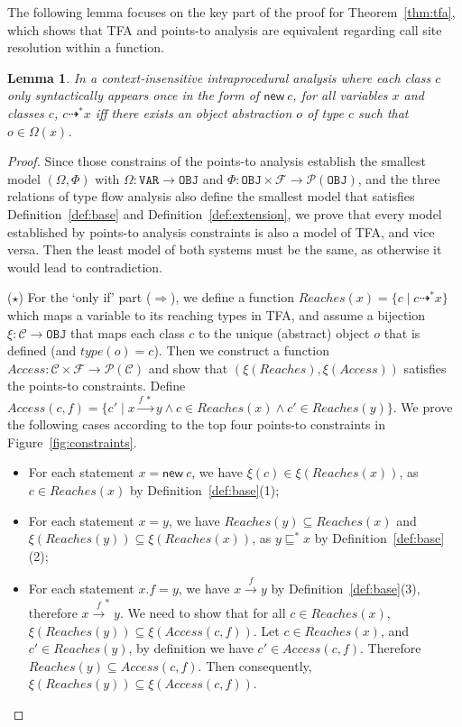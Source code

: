 \documentclass{fac}
\newtheorem{Lemma}{Lemma}
\newcommand{\keyword}[1]{\mathsf{#1}}
\newcommand{\kwnew}[0]{\keyword{new}}
\newcommand\Var{\mathtt{VAR}}
\newcommand\Obj{\mathtt{OBJ}}
\newcommand{\VPT}{\Omega}
\newcommand{\HPT}{\Phi}
\newcommand{\Class}{\mathcal{C}}
\newcommand{\Field}{\mathcal{F}}
\newcommand{\less}{\sqsubseteq}
\newcommand{\tflow}{\dashrightarrow}
\newcommand{\hflow}{\longrightarrow}
\newcommand{\lhflow}[1]{\stackrel{#1}{\hflow}}
\newcommand\set[1]{\{#1\}}
\newcommand\power{\mathcal{P}}
\begin{document}
The following lemma focuses on the key part of the proof for Theorem~\ref{thm:tfa}, which shows that TFA and points-to analysis are equivalent regarding call site resolution within a function.

\begin{Lemma}\label{lem:tfa-intra}
In a context-insensitive intraprocedural analysis where each class $c$ only syntactically appears once in the form of $\kwnew\ c$, for all variables $x$ and classes $c$, $c\tflow^*x$ iff there exists an object abstraction $o$ of type $c$ such that $o\in\VPT(x)$.
\end{Lemma}
\begin{proof}
Since those constrains of the points-to analysis establish the smallest model $(\VPT, \HPT)$ with $\VPT:\Var\rightarrow\Obj$ and $\HPT:\Obj\times\Field\rightarrow\power(\Obj)$, and the three relations of type flow analysis also define the smallest model that satisfies Definition~\ref{def:base} and Definition~\ref{def:extension}, we prove that every model established by points-to analysis constraints is also a model of TFA, and vice versa. Then the least model of both systems must be the same, as otherwise it would lead to contradiction.

\medskip

($\star$) For the `only if' part ($\Rightarrow$), we define a function $Reaches(x)=\set{c\mid c\tflow^* x}$ which maps a variable to its reaching types in TFA, and assume a bijection $\xi:\Class\rightarrow\Obj$ that maps each class $c$ to the unique (abstract) object $o$ that is defined (and $type(o)=c$). Then we construct a function $Access:\Class\times\Field\rightarrow\power(\Class)$ and show that $(\xi(Reaches),\xi(Access))$ satisfies the points-to constraints. Define $Access(c,f)=\set{c'\mid x\lhflow{f\ *}y\wedge c\in Reaches(x)\wedge c'\in Reaches(y)}$. We prove the following cases according to the top four points-to constraints in Figure~\ref{fig:constraints}.
\begin{itemize}
\item For each statement $x = \kwnew\ c$, we have $\xi(c)\in\xi(Reaches(x))$, as $c\in Reaches(x)$ by Definition~\ref{def:base}(1);
\item For each statement $x = y$, we have $Reaches(y)\subseteq Reaches(x)$ and $\xi(Reaches(y))\subseteq\xi(Reaches(x))$, as $y\less^*x$ by Definition~\ref{def:base}(2);
\item For each statement $x.f = y$, we have $x\lhflow{f}y$ by Definition~\ref{def:base}(3), therefore $x\lhflow{f}^*y$. We need to show that for all $c\in Reaches(x)$, $\xi(Reaches(y))\subseteq \xi(Access(c,f))$.
      Let $c\in Reaches(x)$, and $c'\in Reaches(y)$, by definition we have $c'\in Access(c,f)$. Therefore $Reaches(y)\subseteq Access(c,f)$. Then consequently,
      $\xi(Reaches(y))\subseteq \xi(Access(c,f))$.


\end{itemize}
\end{proof}
\end{document}
